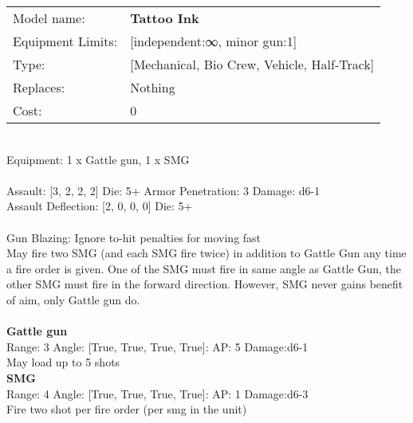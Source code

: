 \noindent
\begin{tabular}{ll}
Model name: &{\bf Tattoo Ink } \\
Equipment Limits: &[independent:∞, minor gun:1] \\
Type: &[Mechanical, Bio Crew, Vehicle, Half-Track] \\
Replaces: &Nothing \\
Cost: & 0\\
\end{tabular}
\ \\
Equipment: 1 x Gattle gun, 1 x SMG \\
\ \\
Assault: [3, 2, 2, 2] Die: 5+ Armor Penetration: 3 Damage: d6-1 \\
Assault Deflection: [2, 0, 0, 0] Die: 5+\\
\indent  
\ \\
Gun Blazing: Ignore to-hit penalties for moving fast\\ 
May fire two SMG (and each SMG fire twice) in addition to Gattle Gun any time a fire order is given. One of the SMG must fire in same angle as Gattle Gun, the other SMG must fire in the forward direction. However, SMG never gains benefit of aim, only Gattle gun do.\\ 

\ \\
{\bf Gattle gun } \\



Range: 3  Angle: [True, True, True, True]: AP: 5 Damage:d6-1 \\
May load up to 5 shots\\ 




{\bf SMG } \\



Range: 4  Angle: [True, True, True, True]: AP: 1 Damage:d6-3 \\
Fire two shot per fire order (per smg in the unit)\\ 




 
\ \\



